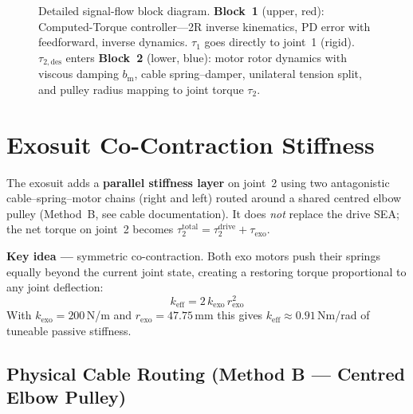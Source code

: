 \documentclass[11pt,a4paper]{article}
\newcommand{\rp}{r_{\mathrm{p}}}
\newcommand{\Jm}{J_{\mathrm{m}}}
\newcommand{\thetam}{\theta_{\mathrm{m}}}
\begin{document}
\begin{figure}[H]
{
}%
\caption{Detailed signal-flow block diagram.
    \textbf{Block~1} (upper, red): Computed-Torque controller---2R inverse kinematics, PD error with feedforward, inverse dynamics.
    $\tau_1$ goes directly to joint~1 (rigid).
    $\tau_{2,\mathrm{des}}$ enters \textbf{Block~2} (lower, blue): motor rotor dynamics with viscous damping $b_{\mathrm{m}}$, cable spring--damper, unilateral tension split, and pulley radius mapping to joint torque $\tau_2$.}
\label{fig:block_diagram}
\end{figure}


\section{Exosuit Co-Contraction Stiffness}
\label{sec:exosuit}

The exosuit adds a \textbf{parallel stiffness layer} on joint~2 using two
antagonistic cable--spring--motor chains (right and left) routed around a
shared centred elbow pulley (Method~B, see cable documentation).
It does \emph{not} replace the drive SEA; the net torque on joint~2 becomes
$\tau_2^{\mathrm{total}} = \tau_2^{\mathrm{drive}} + \tau_{\mathrm{exo}}$.

\begin{resultbox}
\textbf{Key idea ---} symmetric co-contraction.
Both exo motors push their springs equally beyond the current joint state,
creating a restoring torque proportional to any joint deflection:
\[
    k_{\mathrm{eff}} = 2\,k_{\mathrm{exo}}\,r_{\mathrm{exo}}^{2}
\]
With $k_{\mathrm{exo}} = 200$\,N/m and $r_{\mathrm{exo}} = 47.75$\,mm this
gives $k_{\mathrm{eff}} \approx 0.91$\,Nm/rad of tuneable passive stiffness.
\end{resultbox}


\subsection{Physical Cable Routing (Method B --- Centred Elbow Pulley)}
\end{document}
